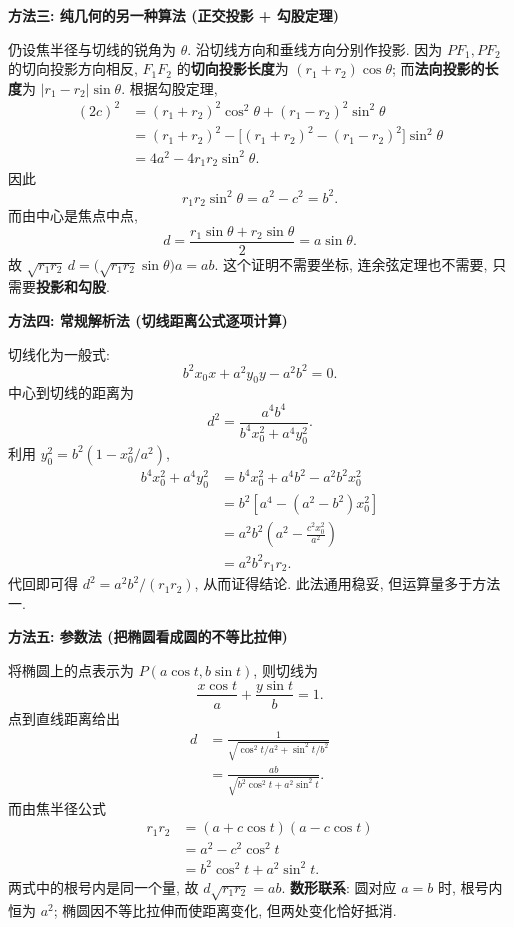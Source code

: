 \begin{proofbox}
\medskip
\textbf{方法三: 纯几何的另一种算法 (正交投影 + 勾股定理)}

仍设焦半径与切线的锐角为 $\theta$.
沿切线方向和垂线方向分别作投影.
因为 $PF_1,PF_2$ 的切向投影方向相反,
$F_1F_2$ 的\textbf{切向投影长度}为 $(r_1+r_2)\cos\theta$;
而\textbf{法向投影的长度}为 $|r_1-r_2|\sin\theta$.
根据勾股定理,
\[
\begin{aligned}
(2c)^2
&=(r_1+r_2)^2\cos^2\theta
 +(r_1-r_2)^2\sin^2\theta\\
&=(r_1+r_2)^2
 -\bigl[(r_1+r_2)^2-(r_1-r_2)^2\bigr]\sin^2\theta\\
&=4a^2-4r_1r_2\sin^2\theta.
\end{aligned}
\]
因此
\[
r_1r_2\sin^2\theta=a^2-c^2=b^2.
\]
而由中心是焦点中点,
\[
d=\frac{r_1\sin\theta+r_2\sin\theta}{2}
=a\sin\theta.
\]
故 $\sqrt{r_1r_2}\,d
=\bigl(\sqrt{r_1r_2}\sin\theta\bigr)a=ab$.
这个证明不需要坐标, 连余弦定理也不需要, 只需要\textbf{投影和勾股}.

\medskip
\textbf{方法四: 常规解析法 (切线距离公式逐项计算)}

切线化为一般式:
\[
b^2x_0x+a^2y_0y-a^2b^2=0.
\]
中心到切线的距离为
\[
d^2=\frac{a^4b^4}{b^4x_0^2+a^4y_0^2}.
\]
利用 $y_0^2=b^2(1-x_0^2/a^2)$,
\[
\begin{aligned}
b^4x_0^2+a^4y_0^2
&=b^4x_0^2+a^4b^2-a^2b^2x_0^2\\
&=b^2\left[a^4-(a^2-b^2)x_0^2\right]\\
&=a^2b^2\left(a^2-\frac{c^2x_0^2}{a^2}\right)\\
&=a^2b^2r_1r_2.
\end{aligned}
\]
代回即可得 $d^2=a^2b^2/(r_1r_2)$, 从而证得结论.
此法通用稳妥, 但运算量多于方法一.

\medskip
\textbf{方法五: 参数法 (把椭圆看成圆的不等比拉伸)}

将椭圆上的点表示为 $P(a\cos t,b\sin t)$, 则切线为
\[
\frac{x\cos t}{a}+\frac{y\sin t}{b}=1.
\]
点到直线距离给出
\[
\begin{aligned}
d&=\frac1{\sqrt{\cos^2t/a^2+\sin^2t/b^2}}\\
&=\frac{ab}{\sqrt{b^2\cos^2t+a^2\sin^2t}}.
\end{aligned}
\]
而由焦半径公式
\[
\begin{aligned}
r_1r_2&=(a+c\cos t)(a-c\cos t)\\
&=a^2-c^2\cos^2t\\
&=b^2\cos^2t+a^2\sin^2t.
\end{aligned}
\]
两式中的根号内是同一个量, 故 $d\sqrt{r_1r_2}=ab$.
\textbf{数形联系}: 圆对应 $a=b$ 时, 根号内恒为 $a^2$;
椭圆因不等比拉伸而使距离变化, 但两处变化恰好抵消.


\end{proofbox}
